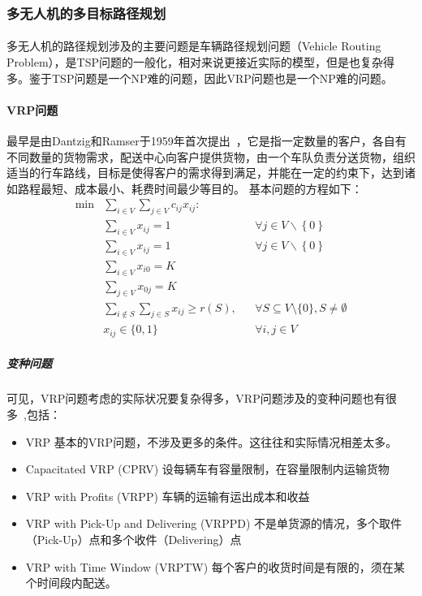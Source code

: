 \documentclass[UTF8,a4paper]{ctexart}
\begin{document}
\subsubsection{多无人机的多目标路径规划}
\paragraph{}多无人机的路径规划涉及的主要问题是车辆路径规划问题（Vehicle Routing Problem），是TSP问题的一般化，相对来说更接近实际的模型，但是也复杂得多。鉴于TSP问题是一个NP难的问题，因此VRP问题也是一个NP难的问题。

\paragraph{VRP问题}最早是由Dantzig和Ramser于1959年首次提出~\cite{dantzig1959truck}，它是指一定数量的客户，各自有不同数量的货物需求，配送中心向客户提供货物，由一个车队负责分送货物，组织适当的行车路线，目标是使得客户的需求得到满足，并能在一定的约束下，达到诸如路程最短、成本最小、耗费时间最少等目的。
基本问题的方程如下：
\begin{align*}
    \min & \sum_{i\in V}\sum_{j \in V}c_{ij}x_{ij}\colon   &  &                                                     \\
         & \sum _{i\in V}x_{ij}=1                          &  & \forall j\in V\backslash \left\{0\right\}           \\
         & \sum _{i\in V}x_{ij}=1                          &  & \forall j\in V\backslash \left\{0\right\}           \\
         & \sum _{i\in V}x_{i0}=K                          &  &                                                     \\
         & \sum _{j\in V}x_{0j}=K                          &  &                                                     \\
         & \sum _{i\notin S}\sum _{j\in S}x_{ij}\geq r(S), &  & \forall S\subseteq V\setminus \{0\},S\neq \emptyset \\
         & x_{ij}\in \{0,1\}                               &  & \forall i,j\in V
\end{align*}
\subparagraph{变种问题}可见，VRP问题考虑的实际状况要复杂得多，VRP问题涉及的变种问题也有很多~\cite{vrpweb},包括：
\begin{itemize}
    \item VRP 基本的VRP问题，不涉及更多的条件。这往往和实际情况相差太多。
    \item Capacitated VRP (CPRV) 设每辆车有容量限制，在容量限制内运输货物
    \item VRP with Profits (VRPP) 车辆的运输有运出成本和收益
    \item VRP with Pick-Up and Delivering (VRPPD) 不是单货源的情况，多个取件（Pick-Up）点和多个收件（Delivering）点
    \item VRP with Time Window (VRPTW) 每个客户的收货时间是有限的，须在某个时间段内配送。
\end{itemize}
\end{document}
